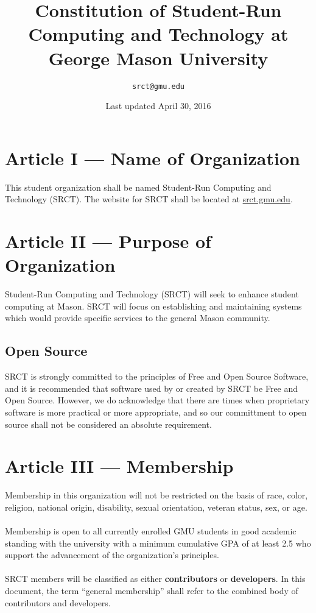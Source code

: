 \documentclass{article}
\title{\bfseries Constitution of Student-Run Computing and Technology at 
George Mason University}
\date{Last updated April 30, 2016}
\author{\texttt{srct@gmu.edu}}
\begin{document}
  
  \maketitle
  
  \section{Article I --- Name of Organization}
  This student organization shall be named Student-Run Computing and 
  Technology (SRCT). The website for SRCT shall be located at 
  \url{srct.gmu.edu}.
  
  \section{Article II --- Purpose of Organization}
  Student-Run Computing and Technology (SRCT) will seek to enhance 
  student computing at Mason. SRCT will focus on establishing and 
  maintaining systems which would provide specific services to the 
  general Mason community.
  
  \subsection{Open Source}
  SRCT is strongly committed to the principles of Free and Open Source
  Software, and it is recommended that software used by or created by SRCT be
  Free and Open Source. However, we do acknowledge that there are times when
  proprietary software is more practical or more appropriate, and so our
  committment to open source shall not be considered an absolute requirement.
  
  \section{Article III --- Membership}
  Membership in this organization will not be restricted on the basis of 
  race, color, religion, national origin, disability, sexual 
  orientation, veteran status, sex, or age. 
  \\ \\
  Membership is open to all currently enrolled GMU students in good 
  academic standing with the university with a minimum cumulative GPA of 
  at least 2.5 who support the advancement of the organization's 
  principles.
  \\ \\
  SRCT members will be classified as either \textbf{contributors} or 
  \textbf{developers}. In this document, the term ``general membership''
  shall refer to the combined body of contributors and developers.
  
\end{document}
